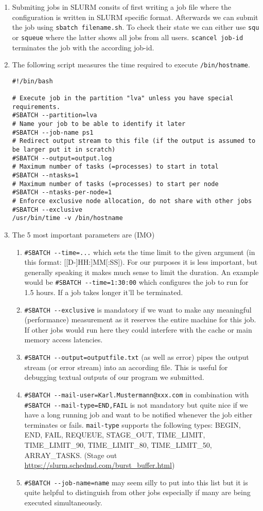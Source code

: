 \documentclass[UTF-8]{article}
\begin{document}
	
	\begin{enumerate}
		\item Submiting jobs in SLURM consits of first writing a job file where the configuration is written in SLURM specific format. Afterwards we can submit the job using \verb|sbatch filename.sh|. To check their state we can either use \verb|squ| or \verb|squeue| where the latter shows all jobs from all users. \verb|scancel job-id| terminates the job with the according job-id.
		\item The following script measures the time required to execute \verb|/bin/hostname|.
		\begin{lstlisting}
#!/bin/bash

# Execute job in the partition "lva" unless you have special requirements.
#SBATCH --partition=lva
# Name your job to be able to identify it later
#SBATCH --job-name ps1
# Redirect output stream to this file (if the output is assumed to be larger put it in scratch)
#SBATCH --output=output.log
# Maximum number of tasks (=processes) to start in total
#SBATCH --ntasks=1
# Maximum number of tasks (=processes) to start per node
#SBATCH --ntasks-per-node=1
# Enforce exclusive node allocation, do not share with other jobs
#SBATCH --exclusive
/usr/bin/time -v /bin/hostname\end{lstlisting}

	\item The 5 most important parameters are (IMO)
	\begin{enumerate}[I]
		\item \verb|#SBATCH --time=...| which sets the time limit to the given argument (in this format: [[D-]HH:]MM[:SS]). For our purposes it is less important, but generally speaking it makes much sense to limit the duration. An example would be \verb|#SBATCH --time=1:30:00| which configures the job to run for 1.5 hours. If a job takes longer it'll be terminated.
		\item \verb|#SBATCH --exclusive| is mandatory if we want to make any meaningful (performance) measurement as it reserves the entire machine for this job. If other jobs would run here they could interfere with the cache or main memory access latencies.
		\item \verb|#SBATCH --output=outputfile.txt| (as well as error) pipes the output stream (or error stream) into an according file. This is useful for debugging textual outputs of our program we submitted.
		\item \verb|#SBATCH --mail-user=Karl.Mustermann@xxx.com| in combination with \verb|#SBATCH --mail-type=END,FAIL| is not mandatory but quite nice if we have a long running job and want to be notified whenever the job either terminates or fails. \verb|mail-type| supports the following types: BEGIN, END, FAIL, REQUEUE, STAGE\_OUT, TIME\_LIMIT, TIME\_LIMIT\_90, TIME\_LIMIT\_80, TIME\_LIMIT\_50, ARRAY\_TASKS. (Stage out \url{https://slurm.schedmd.com/burst_buffer.html})
		\item \verb|#SBATCH --job-name=name| may seem silly to put into this list but it is quite helpful to distinguish from other jobs especially if many are being executed simultaneously.
	\end{enumerate}


\end{enumerate}
\end{document}
